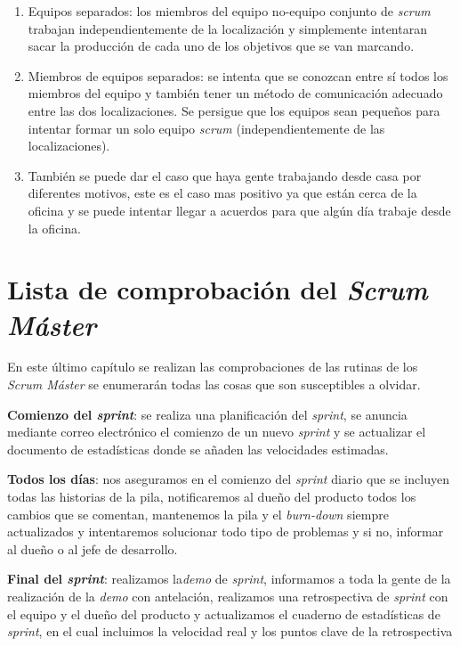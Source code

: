 \begin{enumerate}[1.]
	\item Equipos separados: los miembros del equipo no-equipo conjunto de \textit{scrum} trabajan independientemente de la localización y simplemente intentaran sacar la producción de cada uno de los objetivos que se van marcando.

	\item Miembros de equipos separados: se intenta que se conozcan entre sí todos los miembros del equipo y también tener un método de comunicación adecuado entre las dos localizaciones. Se persigue que los equipos sean pequeños para intentar formar un solo equipo \textit{scrum} (independientemente de las localizaciones).
		
	\item También se puede dar el caso que haya gente trabajando desde casa por diferentes motivos, este es el caso mas positivo ya que están cerca de la oficina y se puede intentar llegar a acuerdos para que algún día trabaje desde la oficina.
\end{enumerate}

\section{Lista de comprobación del \textit{Scrum Máster}}

En este último capítulo se realizan las comprobaciones de las rutinas de los \textit{Scrum Máster} se enumerarán todas las cosas que son susceptibles a olvidar.

\textbf{Comienzo del \textit{sprint}}: se realiza una planificación del \textit{sprint}, se anuncia mediante correo electrónico el comienzo de un nuevo \textit{sprint} y se actualizar el documento de estadísticas donde se añaden las velocidades estimadas.

\textbf{Todos los días}: nos aseguramos en el comienzo del \textit{sprint} diario que se incluyen todas las historias de la pila, notificaremos al dueño del producto todos los cambios que se comentan, mantenemos la pila y el \textit{burn-down} siempre actualizados y intentaremos solucionar todo tipo de problemas y si no, informar al dueño o al jefe de desarrollo.

\textbf{Final del \textit{sprint}}: realizamos la\textit{demo} de \textit{sprint}, informamos a toda la gente de la realización de la \textit{demo} con antelación, realizamos una retrospectiva de  \textit{sprint} con el equipo y el dueño del producto y actualizamos el cuaderno de estadísticas de  \textit{sprint}, en el cual incluimos la velocidad real y los puntos clave de la retrospectiva

